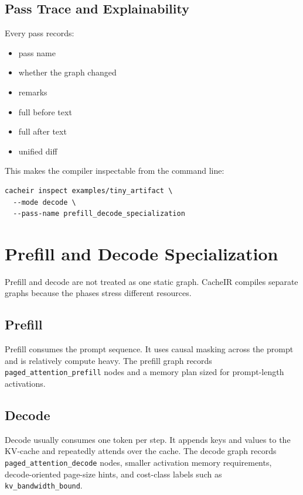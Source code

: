 \documentclass[11pt]{article}
\begin{document}
\subsection{Pass Trace and Explainability}

Every pass records:

\begin{itemize}[leftmargin=*]
  \item pass name
  \item whether the graph changed
  \item remarks
  \item full before text
  \item full after text
  \item unified diff
\end{itemize}

This makes the compiler inspectable from the command line:

\begin{lstlisting}
cacheir inspect examples/tiny_artifact \
  --mode decode \
  --pass-name prefill_decode_specialization
\end{lstlisting}

\section{Prefill and Decode Specialization}

Prefill and decode are not treated as one static graph. CacheIR compiles separate
graphs because the phases stress different resources.

\subsection{Prefill}

Prefill consumes the prompt sequence. It uses causal masking across the prompt and
is relatively compute heavy. The prefill graph records
\texttt{paged\_attention\_prefill} nodes and a memory plan sized for prompt-length
activations.

\subsection{Decode}

Decode usually consumes one token per step. It appends keys and values to the
KV-cache and repeatedly attends over the cache. The decode graph records
\texttt{paged\_attention\_decode} nodes, smaller activation memory requirements,
decode-oriented page-size hints, and cost-class labels such as
\texttt{kv\_bandwidth\_bound}.
\end{document}
